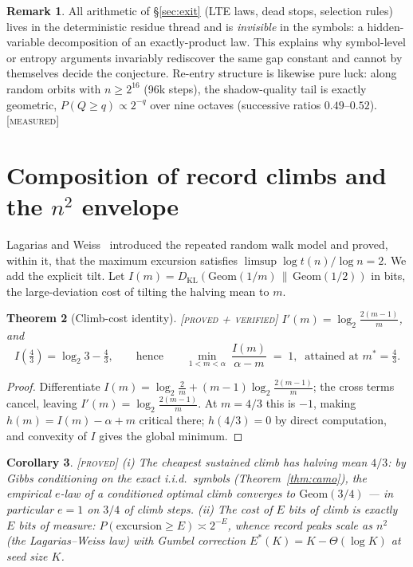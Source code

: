 \documentclass[11pt]{article}
\newtheorem{theorem}{Theorem}[section]
\newtheorem{corollary}[theorem]{Corollary}
\theoremstyle{definition}
\newtheorem{remark}[theorem]{Remark}
\newcommand{\PROVED}{\textup{[\textsc{proved}]}}
\newcommand{\PROVEDVER}{\textup{[\textsc{proved + verified}]}}
\newcommand{\MEASURED}{\textup{[\textsc{measured}]}}
\begin{document}
\begin{remark}
All arithmetic of \S\ref{sec:exit} (LTE laws, dead stops, selection rules)
lives in the deterministic residue thread and is \emph{invisible} in the
symbols: a hidden-variable decomposition of an exactly-product law. This
explains why symbol-level or entropy arguments invariably rediscover the same
gap constant and cannot by themselves decide the conjecture.
Re-entry structure is likewise pure luck: along random orbits with
$n\ge 2^{16}$ (96k steps), the shadow-quality tail is exactly geometric,
$P(Q\ge q)\propto 2^{-q}$ over nine octaves (successive ratios
$0.49$--$0.52$). \MEASURED
\end{remark}

\section{Composition of record climbs and the $n^{2}$ envelope}\label{sec:n2}
Lagarias and Weiss~\cite{LW} introduced the repeated random walk model and
proved, within it, that the maximum excursion satisfies $\limsup \log
t(n)/\log n=2$. We add the explicit tilt. Let
$I(m)=D_{\mathrm{KL}}(\mathrm{Geom}(1/m)\,\|\,\mathrm{Geom}(1/2))$ in bits, the
large-deviation cost of tilting the halving mean to $m$.

\begin{theorem}[Climb-cost identity]\label{thm:tilt} \PROVEDVER\;
$I'(m)=\log_2\frac{2(m-1)}{m}$, and
\[
I(\tfrac43)=\log_2 3-\tfrac43,\qquad\text{hence}\qquad
\min_{1<m<\alpha}\ \frac{I(m)}{\alpha-m}\;=\;1,\ \text{ attained at } m^{*}=\tfrac43 .
\]
\end{theorem}
\begin{proof}
Differentiate $I(m)=\log_2\frac{2}{m}+(m-1)\log_2\frac{2(m-1)}{m}$; the cross
terms cancel, leaving $I'(m)=\log_2\frac{2(m-1)}{m}$. At $m=4/3$ this is
$-1$, making $h(m)=I(m)-\alpha+m$ critical there; $h(4/3)=0$ by direct
computation, and convexity of $I$ gives the global minimum.
\end{proof}

\begin{corollary} \PROVED\;
(i) The cheapest sustained climb has halving mean $4/3$: by Gibbs
conditioning on the exact i.i.d.\ symbols (Theorem~\ref{thm:camo}), the
empirical $e$-law of a conditioned optimal climb converges to
$\mathrm{Geom}(3/4)$ --- in particular $e{=}1$ on $3/4$ of climb steps.
(ii) The cost of $E$ bits of climb is exactly $E$ bits of measure:
$P(\text{excursion}\ge E)\asymp 2^{-E}$, whence record peaks scale as $n^{2}$
(the Lagarias--Weiss law) with Gumbel correction
$E^{*}(K)=K-\Theta(\log K)$ at seed size $K$.
\end{corollary}
\end{document}
